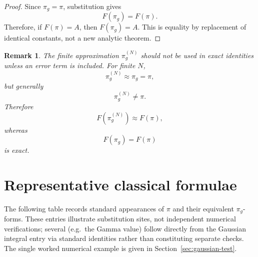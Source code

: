 \documentclass[11pt]{article}
\newtheorem{remark}{Remark}
\begin{document}
\begin{proof}
Since \(\pi_g=\pi\), substitution gives
\[
F(\pi_g)=F(\pi).
\]
Therefore, if \(F(\pi)=A\), then \(F(\pi_g)=A\). This is equality by
replacement of identical constants, not a new analytic theorem.
\end{proof}

\begin{remark}
The finite approximation \(\pi_g^{(N)}\) should not be used in exact identities
unless an error term is included. For finite \(N\),
\[
\pi_g^{(N)}\approx \pi_g=\pi,
\]
but generally
\[
\pi_g^{(N)}\neq \pi.
\]
Therefore
\[
F(\pi_g^{(N)})\approx F(\pi),
\]
whereas
\[
F(\pi_g)=F(\pi)
\]
is exact.
\end{remark}

\section{Representative classical formulae}

The following table records standard appearances of \(\pi\) and their
equivalent \(\pi_g\)-forms. These entries illustrate substitution sites, not
independent numerical verifications; several (e.g.\ the Gamma value) follow
directly from the Gaussian integral entry via standard identities rather than
constituting separate checks. The single worked numerical example is given in
Section~\ref{sec:gaussian-test}.
\end{document}
